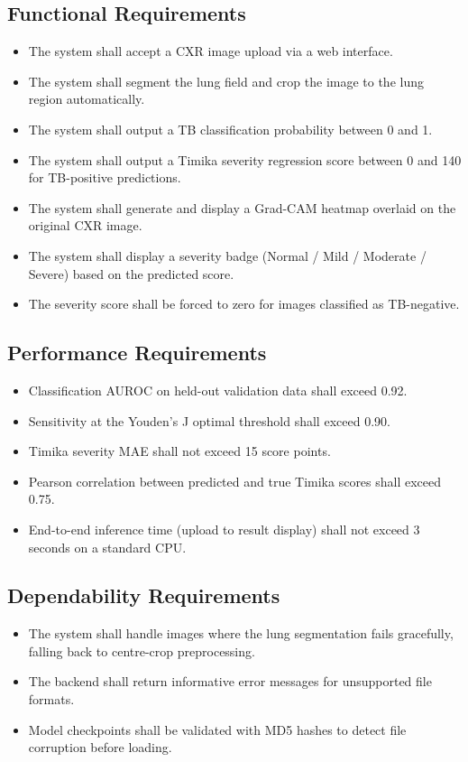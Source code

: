 \documentclass[12pt]{report}
\begin{document}
\subsection{Functional Requirements}
\begin{itemize}
    \item The system shall accept a CXR image upload via a web interface.
    \item The system shall segment the lung field and crop the image to the lung region automatically.
    \item The system shall output a TB classification probability between 0 and 1.
    \item The system shall output a Timika severity regression score between 0 and 140 for TB-positive predictions.
    \item The system shall generate and display a Grad-CAM heatmap overlaid on the original CXR image.
    \item The system shall display a severity badge (Normal / Mild / Moderate / Severe) based on the predicted score.
    \item The severity score shall be forced to zero for images classified as TB-negative.
\end{itemize}

\subsection{Performance Requirements}
\begin{itemize}
    \item Classification AUROC on held-out validation data shall exceed 0.92.
    \item Sensitivity at the Youden's J optimal threshold shall exceed 0.90.
    \item Timika severity MAE shall not exceed 15 score points.
    \item Pearson correlation between predicted and true Timika scores shall exceed 0.75.
    \item End-to-end inference time (upload to result display) shall not exceed 3 seconds on a standard CPU.
\end{itemize}

\subsection{Dependability Requirements}
\begin{itemize}
    \item The system shall handle images where the lung segmentation fails gracefully, falling back to centre-crop preprocessing.
    \item The backend shall return informative error messages for unsupported file formats.
    \item Model checkpoints shall be validated with MD5 hashes to detect file corruption before loading.
\end{itemize}
\end{document}
